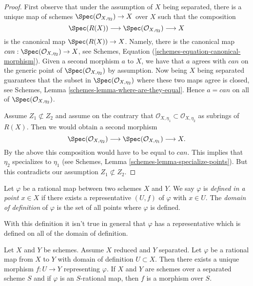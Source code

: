 \begin{proof}
First observe that under the assumption of $X$ being separated,
there is a unique map of schemes
$\Spec(\mathcal{O}_{X, \eta_2}) \to X$ over $X$
such that the composition
$$
\Spec(R(X)) \longrightarrow
\Spec(\mathcal{O}_{X, \eta_2}) \longrightarrow X
$$
is the canonical map $\Spec(R(X)) \to X$.
Namely, there is the canonical map
$can : \Spec(\mathcal{O}_{X, \eta_2}) \to X$, see
Schemes, Equation (\ref{schemes-equation-canonical-morphism}).
Given a second morphism $a$ to $X$, we have that $a$ agrees with $can$
on the generic point of
$\Spec(\mathcal{O}_{X, \eta_2})$ by assumption.
Now being $X$ being separated guarantees that the subset in
$\Spec(\mathcal{O}_{X, \eta_2})$ where
these two maps agree is closed, see
Schemes, Lemma \ref{schemes-lemma-where-are-they-equal}.
Hence $a = can$ on all of $\Spec(\mathcal{O}_{X, \eta_2})$.

\medskip\noindent
Assume $Z_1 \not \subset Z_2$ and assume on the contrary that
$\mathcal{O}_{X, \eta_{1}} \subset \mathcal{O}_{X, \eta_{2}}$
as subrings of $R(X)$. Then we would obtain a second morphism
$$
\Spec(\mathcal{O}_{X, \eta_{2}}) \longrightarrow
\Spec(\mathcal{O}_{X, \eta_{1}}) \longrightarrow
X.
$$
By the above this composition would have to be equal to $can$.
This implies that $\eta_2$ specializes to $\eta_1$ (see
Schemes, Lemma \ref{schemes-lemma-specialize-points}).
But this contradicts our assumption $Z_1 \not \subset Z_2$.
\end{proof}

\begin{definition}
\label{definition-domain-of-definition}
Let $\varphi$ be a rational map between two schemes $X$ and $Y$. We say
$\varphi$ is {\it defined in a point $x \in X$} if there exists a
representative $(U, f)$ of $\varphi$ with $x \in U$. The
{\it domain of definition} of $\varphi$ is the set of all points
where $\varphi$ is defined.
\end{definition}

\noindent
With this definition it isn't true in general that $\varphi$ has a
representative which is defined on all of the domain of definition.

\begin{lemma}
\label{lemma-rational-map-from-reduced-to-separated}
Let $X$ and $Y$ be schemes. Assume $X$ reduced and $Y$ separated. Let
$\varphi$ be a rational map from $X$ to $Y$ with domain of definition
$U \subset X$. Then there exists a unique morphism $f : U \to Y$
representing $\varphi$. If $X$ and $Y$ are schemes over a separated
scheme $S$ and if $\varphi$ is an $S$-rational map, then $f$ is a
morphism over $S$.
\end{lemma}

